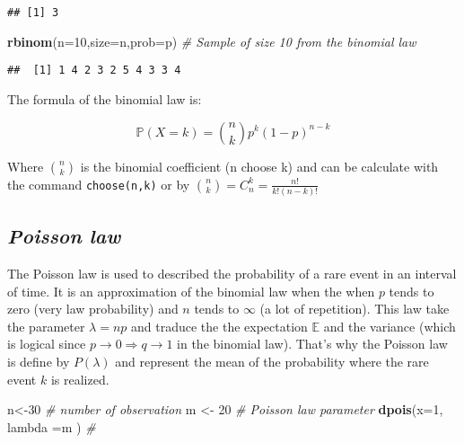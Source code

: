 \documentclass[
]{article}
\newenvironment{Shaded}{\begin{snugshade}}{\end{snugshade}}
\newcommand{\AttributeTok}[1]{\textcolor[rgb]{0.13,0.29,0.53}{#1}}
\newcommand{\CommentTok}[1]{\textcolor[rgb]{0.56,0.35,0.01}{\textit{#1}}}
\newcommand{\DecValTok}[1]{\textcolor[rgb]{0.00,0.00,0.81}{#1}}
\newcommand{\FunctionTok}[1]{\textcolor[rgb]{0.13,0.29,0.53}{\textbf{#1}}}
\newcommand{\NormalTok}[1]{#1}
\newcommand{\OtherTok}[1]{\textcolor[rgb]{0.56,0.35,0.01}{#1}}
\begin{document}
\begin{verbatim}
## [1] 3
\end{verbatim}

\begin{Shaded}
\begin{Highlighting}[]
\FunctionTok{rbinom}\NormalTok{(}\AttributeTok{n=}\DecValTok{10}\NormalTok{,}\AttributeTok{size=}\NormalTok{n,}\AttributeTok{prob=}\NormalTok{p) }\CommentTok{\# Sample of size 10 from the binomial law}
\end{Highlighting}
\end{Shaded}

\begin{verbatim}
##  [1] 1 4 2 3 2 5 4 3 3 4
\end{verbatim}

The formula of the binomial law is:

\[\mathbb{P}(X = k) = \binom{n}{k} p^k (1-p)^{n-k}\]

Where \(\binom{n}{k}\) is the binomial coefficient (n choose k) and can
be calculate with the command \texttt{choose(n,k)} or by
\(\binom{n}{k} =C_n^{k}= \frac{n!}{k!(n-k)!}\)

\hypertarget{poisson-law}{%
\subsection{\texorpdfstring{\emph{Poisson
law}}{Poisson law}}\label{poisson-law}}

The Poisson law is used to described the probability of a rare event in
an interval of time. It is an approximation of the binomial law when the
when \(p\) tends to zero (very law probability) and \(n\) tends to
\(\infty\) (a lot of repetition). This law take the parameter
\(\lambda = np\) and traduce the the expectation \(\mathbb{E}\) and the
variance (which is logical since
\(p\rightarrow0\Rightarrow q\rightarrow1\) in the binomial law). That's
why the Poisson law is define by \(P(\lambda)\) and represent the mean
of the probability where the rare event \(k\) is realized.

\begin{Shaded}
\begin{Highlighting}[]
\NormalTok{n}\OtherTok{\textless{}{-}}\DecValTok{30} \CommentTok{\# number of observation}
\NormalTok{m }\OtherTok{\textless{}{-}} \DecValTok{20} \CommentTok{\#  Poisson law parameter}
\FunctionTok{dpois}\NormalTok{(}\AttributeTok{x=}\DecValTok{1}\NormalTok{, }\AttributeTok{lambda =}\NormalTok{m ) }\CommentTok{\#}
\end{Highlighting}
\end{Shaded}
\end{document}

